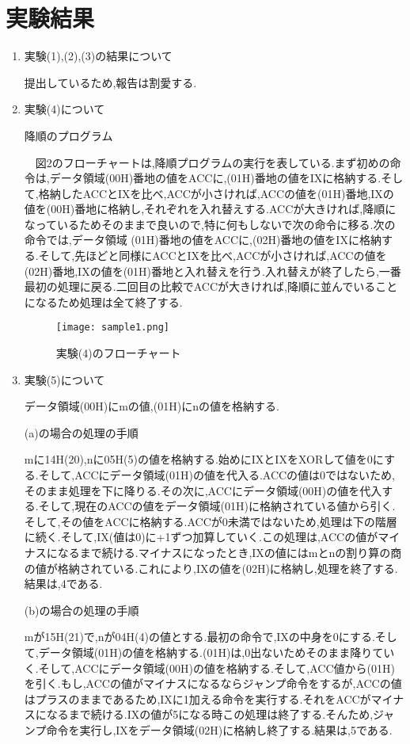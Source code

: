 \documentclass[a4paper,11pt,titlepage]{jarticle}
\begin{document}
 \section{実験結果}
 \begin{enumerate}
 	\item	 実験(1),(2),(3)の結果について\par
 		提出しているため,報告は割愛する.
 		
 	\item 実験(4)について\par

   
 	降順のプログラム\par
	　図2のフローチャートは,降順プログラムの実行を表している.まず初めの命令は,データ領域(00H)番地の値をACCに,(01H)番地の値をIXに格納する.そして,格納したACCとIXを比べ,ACCが小さければ,ACCの値を(01H)番地,IXの値を(00H)番地に格納し,それぞれを入れ替えする.ACCが大きければ,降順になっているためそのままで良いので,特に何もしないで次の命令に移る.次の命令では,データ領域 (01H)番地の値をACCに,(02H)番地の値をIXに格納する.そして,先ほどと同様にACCとIXを比べ,ACCが小さければ,ACCの値を(02H)番地,IXの値を(01H)番地と入れ替えを行う.入れ替えが終了したら,一番最初の処理に戻る.二回目の比較でACCが大きければ,降順に並んでいることになるため処理は全て終了する.\par
 \begin{figure}[htbp]
  \centering
  \texttt{[image: sample1.png]}
  \label{実験(4)のフローチャート}\\
  \caption{実験(4)のフローチャート}
\end{figure}
\clearpage



 	\item 実験(5)について\par
 	データ領域(00H)にmの値,(01H)にnの値を格納する.\par
 	(a)の場合の処理の手順\par
  mに14H(20),nに05H(5)の値を格納する.始めにIXとIXをXORして値を0にする.そして,ACCにデータ領域(01H)の値を代入る.ACCの値は0ではないため,そのまま処理を下に降りる.その次に,ACCにデータ領域(00H)の値を代入する.そして,現在のACCの値をデータ領域(01H)に格納されている値から引く.そして,その値をACCに格納する.ACCが0未満ではないため,処理は下の階層に続く.そして,IX(値は0)に+1ずつ加算していく.この処理は,ACCの値がマイナスになるまで続ける.マイナスになったとき,IXの値にはmとnの割り算の商の値が格納されている.これにより,IXの値を(02H)に格納し,処理を終了する.結果は,4である.\par
  \clearpage
  	(b)の場合の処理の手順\par
  	mが15H(21)で,nが04H(4)の値とする.最初の命令で,IXの中身を0にする.そして,データ領域(01H)の値を格納する.(01H)は,0出ないためそのまま降りていく.そして,ACCにデータ領域(00H)の値を格納する.そして,ACC値から(01H)を引く.もし,ACCの値がマイナスになるならジャンプ命令をするが,ACCの値はプラスのままであるため,IXに1加える命令を実行する.それをACCがマイナスになるまで続ける.IXの値が5になる時この処理は終了する.そんため,ジャンプ命令を実行し,IXをデータ領域(02H)に格納し終了する.結果は,5である.\par
  	

\end{enumerate}
\end{document}
